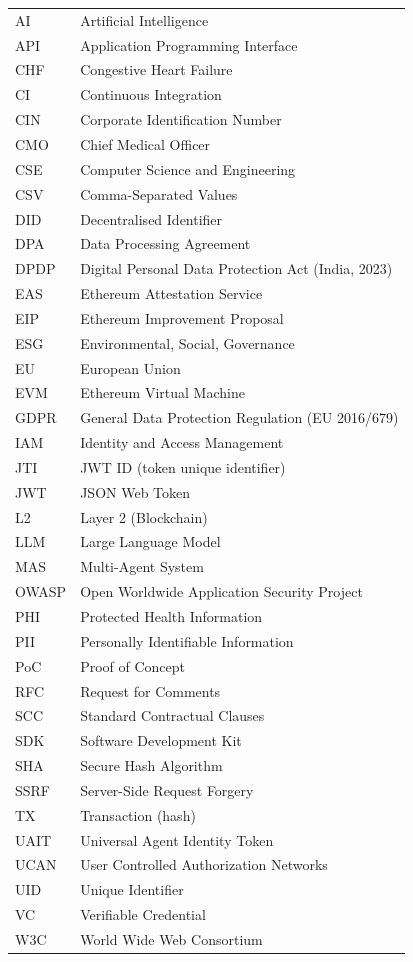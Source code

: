 \documentclass[12pt]{report}
\begin{document}
\noindent\small
\renewcommand{\arraystretch}{1.05}
\begin{tabular}{@{}lp{12cm}@{}}
AI    & Artificial Intelligence \\
API   & Application Programming Interface \\
CHF   & Congestive Heart Failure \\
CI    & Continuous Integration \\
CIN   & Corporate Identification Number \\
CMO   & Chief Medical Officer \\
CSE   & Computer Science and Engineering \\
CSV   & Comma-Separated Values \\
DID   & Decentralised Identifier \\
DPA   & Data Processing Agreement \\
DPDP  & Digital Personal Data Protection Act (India, 2023) \\
EAS   & Ethereum Attestation Service \\
EIP   & Ethereum Improvement Proposal \\
ESG   & Environmental, Social, Governance \\
EU    & European Union \\
EVM   & Ethereum Virtual Machine \\
GDPR  & General Data Protection Regulation (EU 2016/679) \\
IAM   & Identity and Access Management \\
JTI   & JWT ID (token unique identifier) \\
JWT   & JSON Web Token \\
L2    & Layer 2 (Blockchain) \\
LLM   & Large Language Model \\
MAS   & Multi-Agent System \\
OWASP & Open Worldwide Application Security Project \\
PHI   & Protected Health Information \\
PII   & Personally Identifiable Information \\
PoC   & Proof of Concept \\
RFC   & Request for Comments \\
SCC   & Standard Contractual Clauses \\
SDK   & Software Development Kit \\
SHA   & Secure Hash Algorithm \\
SSRF  & Server-Side Request Forgery \\
TX    & Transaction (hash) \\
UAIT  & Universal Agent Identity Token \\
UCAN  & User Controlled Authorization Networks \\
UID   & Unique Identifier \\
VC    & Verifiable Credential \\
W3C   & World Wide Web Consortium \\
\end{tabular}
\renewcommand{\arraystretch}{1}
\normalsize








\end{document}
